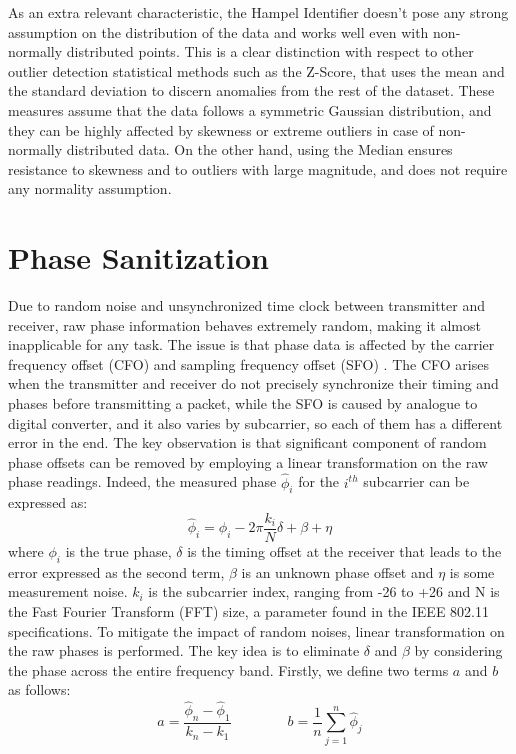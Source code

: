 \documentclass[binding=0.7cm, oneside]{sapthesis}
\begin{document}
As an extra relevant characteristic, the Hampel Identifier doesn't pose any strong assumption on the distribution of the data and works well even with non-normally distributed points. This is a clear distinction
with respect to other outlier detection statistical methods such as the Z-Score, that uses the mean and the standard deviation to discern anomalies
from the rest of the dataset. These measures assume that the data follows a symmetric Gaussian distribution, and they can be highly affected by skewness
or extreme outliers in case of non-normally distributed data. On the other hand, using the Median ensures resistance to skewness and to outliers with large
magnitude, and does not require any normality assumption.

\section{Phase Sanitization}
\label{sec:cal}
Due to random noise and unsynchronized time clock between transmitter and receiver, raw phase information behaves extremely random, making it almost inapplicable for any task.
The issue is that phase data is affected by the carrier frequency offset (CFO) and sampling frequency offset (SFO) \cite{phase_noise}. The CFO arises when the transmitter and
receiver do not precisely synchronize their timing and phases before transmitting a packet, while the SFO is caused by analogue to digital converter, and it also varies by subcarrier, so each of them has a different
error in the end. The key observation is that significant component of random phase offsets can be removed by employing a linear transformation \cite{Phase_cal1,Phase_cal3} on the raw phase readings.
Indeed, the measured phase $\hat{\phi}_i$ for the $i^{th}$ subcarrier can be expressed as:
$$\hat{\phi}_i = {\phi}_i - 2\pi\frac{k_i}{N}\delta + \beta +\eta$$
where $\phi_i$ is the true phase, $\delta$ is the timing offset at the receiver that leads to the error expressed as the second term, $\beta$ is an unknown phase offset and $\eta$ is some measurement noise.
$k_i$ is the subcarrier index, ranging from -26 to +26 and N is the Fast Fourier Transform (FFT) size, a parameter found in the IEEE 802.11 specifications.
To mitigate the impact of random noises, linear transformation on the raw phases is performed. The key idea is to eliminate $\delta$ and $\beta$ by considering the phase across the entire frequency band. Firstly, we define two terms
$a$ and $b$ as follows:
$$ a = \frac{\hat{\phi}_n - \hat{\phi}_1}{k_n - k_1} \qquad \qquad b = \frac{1}{n}\sum_{j=1}^{n}\hat{\phi}_j$$
\end{document}
